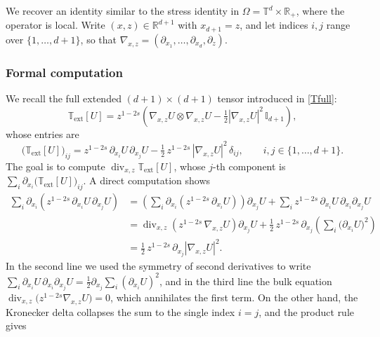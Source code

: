 \documentclass[12pt,a4paper,twoside]{article}
\newcommand{\Div}{\operatorname{div}}
\newcommand{\Grad}{\nabla}
\numberwithin{equation}{section}%
\begin{document}
We recover an identity similar to the stress identity in $\Omega=\mathbb{T}^d\times\mathbb{R}_+$, where the operator is local. Write $(x,z)\in\mathbb{R}^{d+1}$ with $x_{d+1}=z$, and let indices $i,j$ range over $\{1,\dots,d+1\}$, so that $\Grad_{x,z}=(\partial_{x_1},\dots,\partial_{x_d},\partial_z)$.

\subsubsection*{Formal computation}
\label{sec:stress-formal}

We recall the full extended $(d+1)\times(d+1)$ tensor introduced in \eqref{Tfull}:
\begin{equation*}
	\mathbb{T}_{\mathrm{ext}}[U] = z^{1-2s} \left( \Grad_{x,z} U \otimes \Grad_{x,z} U - \tfrac12 |\Grad_{x,z} U|^2\, \mathbb{I}_{d+1} \right),
\end{equation*}
whose entries are
\begin{equation}\label{Tfull-entries}
	\big(\mathbb{T}_{\mathrm{ext}}[U]\big)_{ij}
	= z^{1-2s}\, \partial_{x_i} U\, \partial_{x_j} U
	- \tfrac12\, z^{1-2s}\, |\Grad_{x,z} U|^2\, \delta_{ij},
	\qquad i,j \in \{1,\dots,d+1\}.
\end{equation}
The goal is to compute $\Div_{x,z}\mathbb{T}_{\mathrm{ext}}[U]$, whose $j$-th component is $\sum_{i} \partial_{x_i} \big(\mathbb{T}_{\mathrm{ext}}[U]\big)_{ij}$. A direct computation shows 
\begin{align}\label{div-dyadic}
	\sum_{i} \partial_{x_i}\!\left( z^{1-2s}\, \partial_{x_i} U\, \partial_{x_j} U \right)
	&= \left( \sum_{i} \partial_{x_i}\!\left( z^{1-2s}\, \partial_{x_i} U \right) \right) \partial_{x_j} U
	+ \sum_{i} z^{1-2s}\, \partial_{x_i} U\, \partial_{x_i} \partial_{x_j} U \nonumber \\
	&= \Div_{x,z}\!\left( z^{1-2s}\, \Grad_{x,z} U \right) \partial_{x_j} U
	+ \tfrac12\, z^{1-2s}\, \partial_{x_j}\!\left( \sum_{i} \big(\partial_{x_i} U\big)^2 \right) \nonumber \\
	&= \tfrac12\, z^{1-2s}\, \partial_{x_j} |\Grad_{x,z} U|^2 .
\end{align}
In the second line we used the symmetry of second derivatives to write $\sum_i \partial_{x_i} U\, \partial_{x_i}\partial_{x_j} U = \tfrac12 \partial_{x_j} \sum_i (\partial_{x_i} U)^2$, and in the third line the bulk equation $\Div_{x,z}\big( z^{1-2s} \Grad_{x,z} U \big) = 0$, which annihilates the first term.
On the other hand,  the Kronecker delta collapses the sum to the single index $i=j$, and the product rule gives
\end{document}
